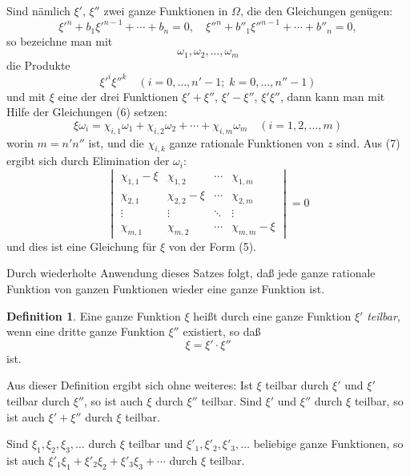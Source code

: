 \documentclass[12pt,a4paper]{article}
\theoremstyle{definition}
\newtheorem{defin}{Definition}[section]
\begin{document}
Sind nämlich $\xi'$, $\xi''$ zwei ganze Funktionen in $\Omega$, die den Gleichungen genügen:
\begin{equation}
\xi'^n + b_1\xi'^{n-1} + \cdots + b_n = 0, \quad \xi''^n + b''_1\xi''^{n-1} + \cdots + b''_n = 0,
\end{equation}
so bezeichne man mit
\[\omega_1, \omega_2, \ldots, \omega_m\]
die Produkte
\[\xi'^i \xi''^k \quad (i = 0, \ldots, n'-1; \; k = 0, \ldots, n''-1)\]
und mit $\xi$ eine der drei Funktionen $\xi' + \xi''$, $\xi' - \xi''$, $\xi'\xi''$, dann kann man mit Hilfe der Gleichungen (6) setzen:
\begin{equation}
\xi\omega_i = \chi_{i,1}\omega_1 + \chi_{i,2}\omega_2 + \cdots + \chi_{i,m}\omega_m \quad (i = 1, 2, \ldots, m)
\end{equation}
worin $m = n'n''$ ist, und die $\chi_{i,k}$ ganze rationale Funktionen von $z$ sind. Aus (7) ergibt sich durch Elimination der $\omega_i$:
\[\begin{vmatrix}
\chi_{1,1} - \xi & \chi_{1,2} & \cdots & \chi_{1,m} \\
\chi_{2,1} & \chi_{2,2} - \xi & \cdots & \chi_{2,m} \\
\vdots & \vdots & \ddots & \vdots \\
\chi_{m,1} & \chi_{m,2} & \cdots & \chi_{m,m} - \xi
\end{vmatrix} = 0\]
und dies ist eine Gleichung für $\xi$ von der Form (5).

Durch wiederholte Anwendung dieses Satzes folgt, daß jede ganze rationale Funktion von ganzen Funktionen wieder eine ganze Funktion ist.

\begin{defin}
Eine ganze Funktion $\xi$ heißt durch eine ganze Funktion $\xi'$ \emph{teilbar}, wenn eine dritte ganze Funktion $\xi''$ existiert, so daß
\begin{equation}
\xi = \xi' \cdot \xi''
\end{equation}
ist.
\end{defin}

Aus dieser Definition ergibt sich ohne weiteres: Ist $\xi$ teilbar durch $\xi'$ und $\xi'$ teilbar durch $\xi''$, so ist auch $\xi$ durch $\xi''$ teilbar. Sind $\xi'$ und $\xi''$ durch $\xi$ teilbar, so ist auch $\xi' + \xi''$ durch $\xi$ teilbar.

Sind $\xi_1, \xi_2, \xi_3, \ldots$ durch $\xi$ teilbar und $\xi'_1, \xi'_2, \xi'_3, \ldots$ beliebige ganze Funktionen, so ist auch $\xi'_1\xi_1 + \xi'_2\xi_2 + \xi'_3\xi_3 + \cdots$ durch $\xi$ teilbar.
\end{document}

